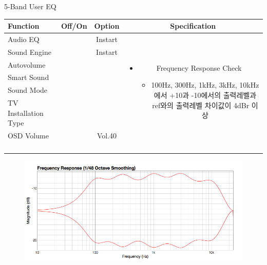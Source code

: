 \begin{frame}[t]{5-Band User EQ}
\begin{tiny}
\begin{tabular}{@{}lccc@{}}
\toprule
Function & Off/On & Option & Specification \\
\midrule
Audio EQ & \color{black}{Off} & Instart &
\multirow{10}{60mm}{
\begin{itemize}
\item Frequency Response Check
	\begin{itemize}
	\item 100Hz, 300Hz, 1kHz, 3kHz, 10kHz에서 +10과 -10에서의 출력레벨과 ref와의 출력레벨 차이값이 4dBr 이상
	\end{itemize}
\end{itemize}
} \\
Sound Engine & \color{blue}{On} & Instart & \\
Autovolume & \color{black}{Off} & & \\
Smart Sound & \color{black}{Off} & & \\
Sound Mode & \color{blue}{On} & \color{blue}{User EQ±10} & \\
TV Installation Type & \color{blue}{On} & \color{blue}{Standtype1} & \\
OSD Volume & \color{blue}{On} & Vol.40 & \\
& & & \\
& & & \\
& & & \\
& & & \\
\midrule
\end{tabular}
\end{tiny}

\begin{figure}[b]
\includegraphics[height=0.4\textwidth]{figures/5_band_user_eq.png}
\end{figure}

\end{frame}

